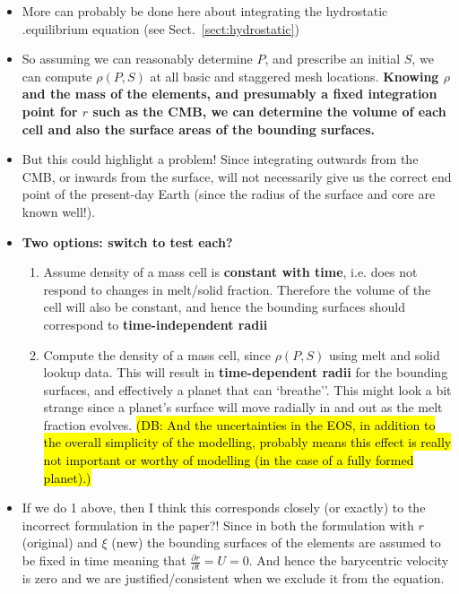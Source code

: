 \documentclass[12pt,notitlepage]{article}
\newcommand{\dbnote}[1]{\sethlcolor{bluehl}\hl{(DB: #1)}}
\begin{document}
\begin{itemize}
\item More can probably be done here about integrating the hydrostatic .equilibrium equation (see Sect.~\ref{sect:hydrostatic})
\item So assuming we can reasonably determine $P$, and prescribe an initial $S$, we can compute $\rho(P,S)$ at all basic and staggered mesh locations.  \textbf{Knowing $\rho$ and the mass of the elements, and presumably a fixed integration point for $r$ such as the CMB, we can determine the volume of each cell and also the surface areas of the bounding surfaces.}
\item But this could highlight a problem!  Since integrating outwards from the CMB, or inwards from the surface, will not necessarily give us the correct end point of the present-day Earth (since the radius of the surface and core are known well!).
\item \textbf{Two options: switch to test each?}
\begin{enumerate}
\item Assume density of a mass cell is \textbf{constant with time}, i.e. does not respond to changes in melt/solid fraction.  Therefore the volume of the cell will also be constant, and hence the bounding surfaces should correspond to \textbf{time-independent radii}
\item Compute the density of a mass cell, since $\rho(P,S)$ using melt and solid lookup data.  This will result in \textbf{time-dependent radii} for the bounding surfaces, and effectively a planet that can `breathe''.  This might look a bit strange since a planet's surface will move radially in and out as the melt fraction evolves.  \dbnote{And the uncertainties in the EOS, in addition to the overall simplicity of the modelling, probably means this effect is really not important or worthy of modelling (in the case of a fully formed planet).}
\end{enumerate}
\item If we do 1 above, then I think this corresponds closely (or exactly) to the incorrect formulation in the paper?!  Since in both the formulation with $r$ (original) and $\xi$ (new) the bounding surfaces of the elements are assumed to be fixed in time meaning that $\frac{\partial r}{\partial t} = U=0$.  And hence the barycentric velocity is zero and we are justified/consistent when we exclude it from the equation.
\end{itemize}
\end{document}
